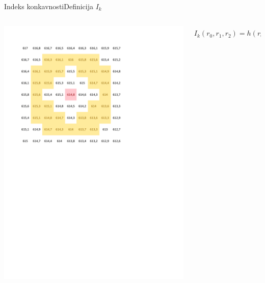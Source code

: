 \documentclass{beamer}
\begin{document}
\begin{frame}{Indeks konkavnosti}{Definicija $I_k$}

\begin{columns}
  \begin{column}{0.5\textwidth}
    \includegraphics[width=\textwidth]{slike/concavity-ring-visualisation-2}
  \end{column}
  \begin{column}{0.6\textwidth}
  \footnotesize
  \begin{equation}  I_k(r_0,r_1,r_2) = h(r_0)- \frac{1}{N}\sum\limits_{r_1<r<r_2} h(r) \label{ik} \end{equation}
  \end{column}
\end{columns}

\end{frame}
\end{document}
